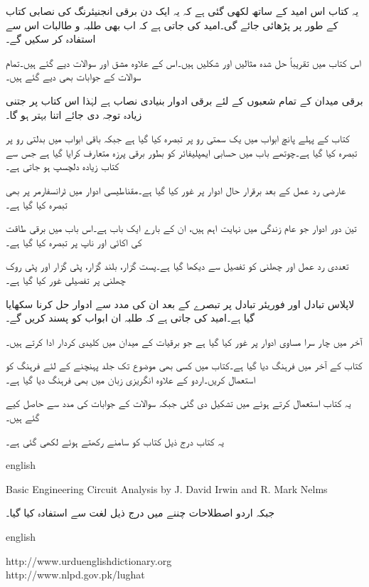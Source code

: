 یہ کتاب اس امید کے ساتھ لکھی گئی ہے کہ یہ ایک دن برقی انجنیئرنگ کی نصابی کتاب کے طور پر پڑھائی جائے گی۔امید کی جاتی ہے کہ اب بھی طلبہ و طالبات اس سے استفادہ کر سکیں گے۔


اس کتاب میں تقریباً  حل شدہ مثالیں اور  شکلیں ہیں۔اس کے علاوہ   مشق اور  سوالات دیے گئے ہیں۔تمام سوالات کے جوابات بھی دیے گئے ہیں۔

برقی میدان کے تمام شعبوں کے لئے برقی ادوار بنیادی نصاب ہے لہٰذا اس کتاب پر جتنی زیادہ توجہ دی جائے اتنا بہتر ہو گا۔

کتاب کے پہلے پانچ ابواب میں یک سمتی رو پر تبصرہ کیا گیا ہے جبکہ باقی ابواب میں بدلتی رو پر تبصرہ کیا گیا ہے۔چوتھے باب میں حسابی ایمپلیفائر کو بطور برقی پرزہ متعارف کرایا گیا ہے جس سے  کتاب زیادہ دلچسپ ہو جاتی ہے۔  

عارضی رد عمل کے بعد برقرار حال ادوار پر غور کیا گیا ہے۔مقناطیسی ادوار میں ٹرانسفارمر پر بھی تبصرہ کیا گیا ہے۔

تین دور ادوار جو عام زندگی میں نہایت اہم ہیں، ان کے بارے  ایک باب ہے۔اس باب میں برقی طاقت کی اکائی اور ناپ پر تبصرہ کیا گیا ہے۔
 

تعددی رد عمل اور چھلنی کو تفصیل سے دیکھا گیا ہے۔پست گزار، بلند گزار، پٹی گزار اور پٹی روک چھلنی پر تفصیلی غور کیا گیا ہے۔

لاپلاس تبادل اور فوریئر تبادل پر تبصرے کے بعد ان کی مدد سے ادوار حل کرنا سکھایا گیا ہے۔امید کی جاتی ہے کہ طلبہ ان ابواب کو پسند کریں گے۔

آخر میں چار سرا مساوی ادوار پر غور کیا گیا ہے جو برقیات کے میدان میں کلیدی کردار ادا کرتے ہیں۔

کتاب کے آخر میں فرہنگ دیا گیا ہے۔کتاب میں کسی بھی موضوع تک جلد پہنچنے کے لئے فرہنگ کو استعمال کریں۔اردو کے علاوہ انگریزی زبان میں بھی فرہنگ دیا گیا ہے۔

یہ کتاب  استعمال کرتے ہوئے  میں تشکیل دی گئی جبکہ سوالات کے جوابات  کی مدد سے حاصل کیے گئے ہیں۔

یہ کتاب درج ذیل کتاب کو سامنے رکھتے ہوئے لکھی گئی ہے۔

{
\begin{otherlanguage*}{english}
\begin{LTR}
Basic Engineering Circuit Analysis by J. David Irwin and R. Mark Nelms
\end{LTR}
\end{otherlanguage*}
}

جبکہ اردو اصطلاحات چننے میں درج ذیل لغت سے استفادہ  کیا گیا۔

{
\begin{otherlanguage*}{english}
\begin{LTR}
http:/\!\!/www.urduenglishdictionary.org\\
http:/\!\!/www.nlpd.gov.pk/lughat
\end{LTR}
\end{otherlanguage*}
}

